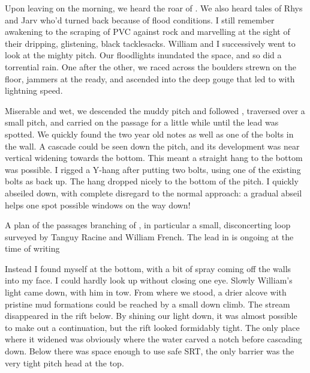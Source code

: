 
Upon leaving  on the morning, we heard the roar of . We also heard tales of Rhys and Jarv who'd turned back because of flood conditions. I still remember awakening to the scraping of PVC against rock and marvelling at  the sight of their dripping, glistening, black tacklesacks. William and I successively went to look at the mighty  pitch. Our floodlights inundated the space, and so did a torrential rain. One after the other, we raced across the boulders strewn on the floor, jammers at the ready, and ascended into the deep gouge that led to  with lightning speed.

Miserable and wet, we descended the muddy pitch and followed , traversed over a small pitch, and carried on the passage for a little while until the  lead was spotted. We quickly found the two year old notes as well as one of the bolts in the wall. A cascade could be seen down the pitch, and its development was near vertical widening towards the bottom. This meant a straight hang to the bottom was possible. I rigged a Y-hang after putting two bolts, using one of the existing bolts as back up. The hang dropped nicely to the bottom of the pitch. I quickly abseiled down, with complete disregard to the normal approach: a gradual abseil helps one spot possible windows on the way down! 

\begin{survey}[t]
	\checkoddpage \ifoddpage \forcerectofloat \else \forceversofloat \fi
    		\centering
    
   		\caption[A plan of the passages branching of \protect{}]{A plan of the passages branching of \protect{}, in particular a small, disconcerting loop surveyed by Tanguy Racine and William French. The lead in \protect{} is ongoing at the time of writing
    		 }
		 \label{serrure scan}
\end{survey}

Instead I found myself at the bottom, with a bit of spray coming off the walls into my face. I could hardly look up without closing one eye. Slowly William's light came down, with him in tow. From where we stood, a drier alcove with pristine mud formations could be reached by a small down climb. The stream disappeared in the rift below. By shining our light down, it was almost possible to make out a continuation, but the rift looked formidably tight. The only place where it widened was obviously where the water carved a notch before cascading down. Below there was space enough to use safe SRT, the only barrier was the very tight pitch head at the top.

